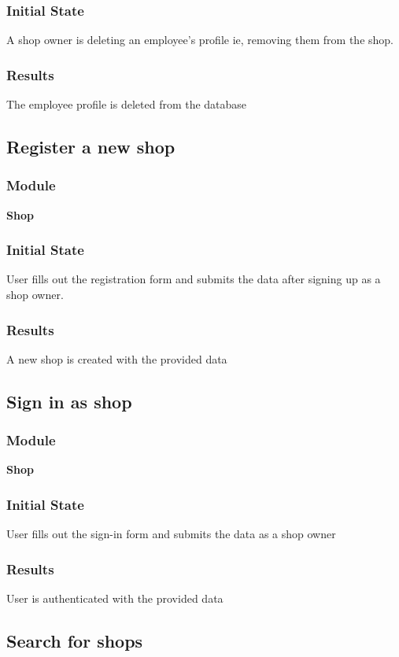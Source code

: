 \documentclass[12pt, titlepage]{article}
\begin{document}
    \subsubsection{Initial State}
    A shop owner is deleting an employee's profile ie, removing them from the shop.
    \subsubsection{Results}
    The employee profile is deleted from the database

\subsection{Register a new shop}
    \subsubsection{Module}
    \textbf{Shop}
    \subsubsection{Initial State}
    User fills out the registration form and submits the data after signing up as a shop owner.
    \subsubsection{Results}
    A new shop is created with the provided data

\subsection{Sign in as shop}
    \subsubsection{Module}
    \textbf{Shop}
    \subsubsection{Initial State}
    User fills out the sign-in form and submits the data as a shop owner
    \subsubsection{Results}
    User is authenticated with the provided data

\subsection{Search for shops}
\end{document}
